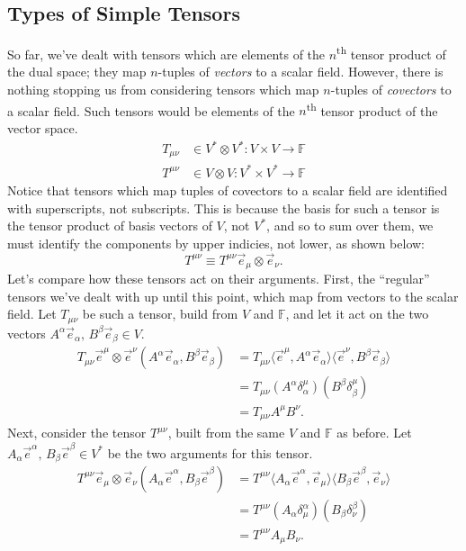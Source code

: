 \subsection{Types of Simple Tensors}
So far, we've dealt with tensors which are elements of the $n$\textsuperscript{th} tensor product of the dual space; they map $n$-tuples of \emph{vectors} to a scalar field.
However, there is nothing stopping us from considering tensors which map $n$-tuples of \emph{covectors} to a scalar field.
Such tensors would be elements of the $n$\textsuperscript{th} tensor product of the vector space.
\begin{align*}
    T_{\mu\nu} &\in V^* \otimes V^* : V \times V \to \mathbb{F} \tag{vectors $\to$ scalar field} \\
    T^{\mu\nu} &\in V \otimes V : V^* \times V^* \to \mathbb{F} \tag{covectors $\to$ scalar field}
\end{align*}
Notice that tensors which map tuples of covectors to a scalar field are identified with superscripts, not subscripts.
This is because the basis for such a tensor is the tensor product of basis vectors of $V$, not $V^*$, and so to sum over them, we must identify the components by upper indicies, not lower, as shown below:
\[ T^{\mu\nu} \equiv T^{\mu\nu} \vec{e}_\mu \otimes \vec{e}_\nu. \]
Let's compare how these tensors act on their arguments. First, the ``regular'' tensors we've dealt with up until this point, which map from vectors to the scalar field. Let $T_{\mu\nu}$ be such a tensor, build from $V$ and $\mathbb{F}$, and let it act on the two vectors $A^\alpha \vec{e}_\alpha,\,B^\beta \vec{e}_\beta \in V$.
\begin{align*}
    T_{\mu\nu} \vec{e}^\mu \otimes \vec{e}^\nu \left( A^\alpha \vec{e}_\alpha, B^\beta \vec{e}_\beta \right) &= T_{\mu\nu} \langle \vec{e}^\mu, A^\alpha \vec{e}_\alpha \rangle \langle \vec{e}^\nu, B^\beta \vec{e}_\beta \rangle \\
    &= T_{\mu\nu} \left( A^\alpha \delta^\mu_\alpha \right) \left( B^\beta \delta^\mu_\beta \right) \\
    &= T_{\mu\nu}A^\mu B^\nu.
\end{align*}
Next, consider the tensor $T^{\mu\nu}$, built from the same $V$ and $\mathbb{F}$ as before. Let $A_\alpha \vec{e}^\alpha,\,B_\beta \vec{e}^\beta \in V^*$ be the two arguments for this tensor. 
\begin{align*}
    T^{\mu\nu} \vec{e}_\mu \otimes \vec{e}_\nu \left(A_\alpha \vec{e}^\alpha,B_\beta \vec{e}^\beta\right) &= T^{\mu\nu} \langle A_\alpha \vec{e}^\alpha, \vec{e}_\mu \rangle \langle B_\beta \vec{e}^\beta, \vec{e}_\nu \rangle \\
    &= T^{\mu\nu} \left(A_\alpha \delta^\alpha_\mu\right) \left(B_\beta \delta^\beta_\nu\right) \\
    &= T^{\mu\nu}A_\mu B_\nu.
\end{align*}
